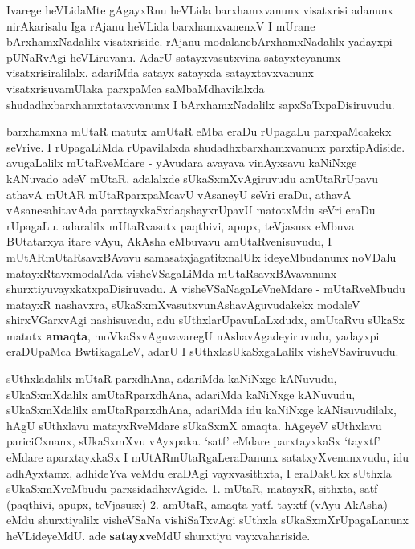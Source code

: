 \centerline{}

\centerline{}

\begin{artha}
 Ivarege heVLidaMte gAgayxRnu heVLida barxhamxvanunx visatxrisi
 adanunx nirAkarisalu Iga rAjanu heVLida barxhamxvanenxV I mUrane
 bArxhamxNadalilx visatxriside. rAjanu modalanebArxhamxNadalilx
 yadayxpi pUNaRvAgi heVLiruvanu. AdarU satayxvasutxvina satayxteyanunx
 visatxrisiralilalx. adariMda satayx satayxda satayxtavxvanunx
 visatxrisuvamUlaka parxpaMca saMbaMdhavilalxda
 shudadhxbarxhamxtatavxvanunx I bArxhamxNadalilx sapxSaTxpaDisiruvudu.
\end{artha}

\newpage
\centerline{}

\begin{artha}
barxhamxna mUtaR matutx amUtaR eMba eraDu rUpagaLu parxpaMcakekx
seVrive. I rUpagaLiMda rUpavilalxda shudadhxbarxhamxvanunx
parxtipAdiside. avugaLalilx \break mUtaRveMdare - yAvudara avayava vinAyxsavu
kaNiNxge kANuvado adeV \-mUtaR, adalalxde sUkaSxmXvAgiruvudu
amUtaRrUpavu athavA mUtAR \break mUtaRparxpaMcavU vAsaneyU seVri eraDu, athavA
vAsanesahitavAda parxtayxkaSx\-daqshayxrUpavU matotxMdu seVri eraDu
rUpagaLu. adaralilx  mUtaRvasutx paqthivi, apupx, teVjasusx eMbuva
BUtatarxya itare vAyu, AkAsha eMbuvavu amUtaR\-venisuvudu, I
mUtARmUtaRsavxBAvavu samasatxjagatitxnalUlx ideyeMbu\-danunx noVDalu
matayxRtavxmodalAda visheVSagaLiMda mUtaRsavxBAvavanunx
shurxtiyuvayxkatx\-paDisiruvadu. A visheVSaNagaLeVneMdare - mUtaRveMbudu
matayxR nashavxra, sUkaSxmX\-vasutxvunAshavAguvudakekx modaleV
shirxVGarxvAgi nashisuvadu, adu sUthxlarUpa\-vuLaLxdudx, amUtaRvu sUkaSx
matutx \textbf{amaqta}, moVkaSxvAguvavaregU nAshavAgadeyiruvudu,
yadayxpi eraDUpaMca BwtikagaLeV, adarU I sUthxlasUkaSxgaLalilx
visheVSa\-viruvudu.
\end{artha}

\begin{artha}
sUthxladalilx mUtaR parxdhAna, adariMda kaNiNxge kANuvudu,
sUkaSxmXdalilx amUtaRparxdhAna, adariMda kaNiNxge kANuvudu,
sUkaSxmXdalilx amUtaRparxdhAna, adariMda idu kaNiNxge kANisuvudilalx,
hAgU sUthxlavu matayxRveMdare sUkaSxmX amaqta. hAgeyeV sUthxlavu
pariciCxnanx, sUkaSxmXvu vAyxpaka. {`satf'} eMdare parxtayxkaSx
{`tayxtf'}  eMdare aparxtayxkaSx I mUtARmUtaRgaLeraDanunx
satatxyXvenunxvudu, idu adhAyxtamx, adhideYva veMdu eraDAgi
vayxvasithxta, I eraDakUkx sUthxla sUkaSxmXveMbudu parxsidadhxvAgide.
1. mUtaR, matayxR, sithxta, satf (paqthivi, apupx, teVjasusx)
2. amUtaR, amaqta yatf. tayxtf (vAyu AkAsha)
eMdu shurxtiyalilx visheVSaNa vishiSaTxvAgi sUthxla
sUkaSxmXrUpagaLanunx heVLideyeMdU. ade \textbf{satayx}veMdU shurxtiyu vayxvahariside.
\end{artha}

